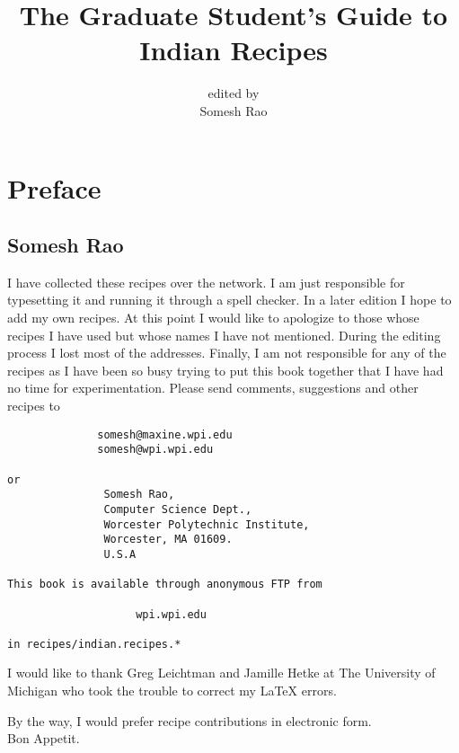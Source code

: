 
\begin{titlepage}

\title{The Graduate Student's Guide to Indian Recipes}
\author{edited by\\Somesh Rao\\}


\maketitle
\thispagestyle{empty}

\end{titlepage}

\tableofcontents
\newpage
\chapter{Preface}
\section{Somesh Rao}
I have collected these recipes over the network. I am just responsible for 
typesetting it and running it through a spell checker. In a later edition I 
hope to add my own recipes. 
At this point I would like to apologize to those whose recipes I have used but 
whose names I have not mentioned. During the editing process I lost most of 
the addresses.
Finally, I am not responsible for any of the recipes as I have been so busy 
trying to put this book together that I have had no time for experimentation.
Please send comments, suggestions and other recipes to
\begin{verbatim}
              somesh@maxine.wpi.edu
              somesh@wpi.wpi.edu

or
               Somesh Rao,
               Computer Science Dept.,
               Worcester Polytechnic Institute,
               Worcester, MA 01609.
               U.S.A

This book is available through anonymous FTP from

                    wpi.wpi.edu

in recipes/indian.recipes.*
\end{verbatim}
I would like to thank Greg Leichtman and Jamille Hetke at The
University of Michigan who took the trouble to correct my \LaTeX
errors. 


By the way, I would prefer recipe contributions in electronic form.\\
Bon Appetit. \\
